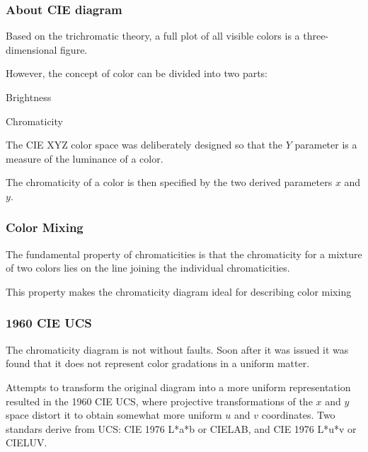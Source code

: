 \documentclass[12pt]{beamer}\usepackage[]{graphicx}\usepackage[]{color}
\begin{document}

\begin{frame}
\frametitle{About CIE diagram}

\bbi
  \item Based on the trichromatic theory, a full plot of all visible colors is 
  a three-dimensional figure.
  \item However, the concept of color can be divided into two parts:
  \bi
    \item Brightness
    \item Chromaticity
  \ei
  \item The CIE XYZ color space was deliberately designed so that the $Y$ 
  parameter is a measure of the luminance of a color.
  \item The chromaticity of a color is then specified by the two derived 
  parameters $x$ and $y$.
\ei

\end{frame}


\begin{frame}
\frametitle{Color Mixing}

\bbi
  \item The fundamental property of chromaticities is that the chromaticity for 
  a mixture of two colors lies on the line joining the individual chromaticities.
  \item This property makes the chromaticity diagram ideal for describing 
  color mixing
\ei

\end{frame}


\begin{frame}
\frametitle{1960 CIE UCS}

The chromaticity diagram is not without faults. Soon after it was issued it
was found that it does not represent color gradations in a uniform matter.
\eb

Attempts to transform the original diagram into a more uniform representation
resulted in the 1960 CIE UCS, where projective transformations of the $x$ and 
$y$ space distort it to obtain somewhat more uniform $u$ and $v$ coordinates.
Two standars derive from UCS: CIE 1976 L*a*b or CIELAB, and CIE 1976 L*u*v 
or CIELUV.
\eb

\end{frame}
\end{document}
